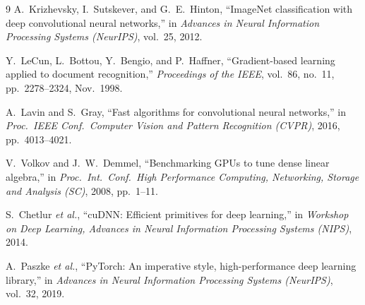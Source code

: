 \documentclass[conference]{IEEEtran}
\begin{document}
\begin{thebibliography}{9}
A.~Krizhevsky, I.~Sutskever, and G.~E.~Hinton,
``ImageNet classification with deep convolutional neural networks,''
in \emph{Advances in Neural Information Processing Systems (NeurIPS)},
vol.~25, 2012.

Y.~LeCun, L.~Bottou, Y.~Bengio, and P.~Haffner,
``Gradient-based learning applied to document recognition,''
\emph{Proceedings of the IEEE}, vol.~86, no.~11, pp.~2278--2324, Nov.~1998.

A.~Lavin and S.~Gray,
``Fast algorithms for convolutional neural networks,''
in \emph{Proc.\ IEEE Conf.\ Computer Vision and Pattern Recognition (CVPR)},
2016, pp.~4013--4021.

V.~Volkov and J.~W.~Demmel,
``Benchmarking GPUs to tune dense linear algebra,''
in \emph{Proc.\ Int.\ Conf.\ High Performance Computing, Networking,
Storage and Analysis (SC)}, 2008, pp.~1--11.

S.~Chetlur \emph{et al.},
``cuDNN: Efficient primitives for deep learning,''
in \emph{Workshop on Deep Learning, Advances in Neural Information
Processing Systems (NIPS)}, 2014.

A.~Paszke \emph{et al.},
``PyTorch: An imperative style, high-performance deep learning library,''
in \emph{Advances in Neural Information Processing Systems (NeurIPS)},
vol.~32, 2019.
\end{thebibliography}
\end{document}
